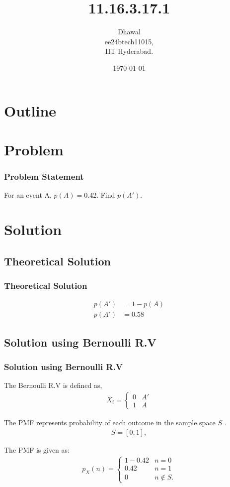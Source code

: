 \documentclass{beamer}
\title{11.16.3.17.1}
\author{Dhawal \\ ee24btech11015,\\IIT Hyderabad.}
\date{\today}
\providecommand{\sbrak}[1]{\ensuremath{{}\left[#1\right]}}
\providecommand{\brak}[1]{\ensuremath{\left(#1\right)}}
\theoremstyle{remark}
\numberwithin{equation}{section}
\begin{document}
\begin{frame}
\titlepage
\end{frame}

\section*{Outline}
\begin{frame}
\tableofcontents
\end{frame}
\section{Problem}
\begin{frame}
\frametitle{Problem Statement}
%
 For an event A, $p\brak{A}=0.42.$ Find $p\brak{A'}$.

\end{frame}

\section{Solution}
\subsection{Theoretical Solution}
\begin{frame}
\frametitle{Theoretical Solution}
\begin{align}
		p\brak{A'}&=1-p\brak{A}\\
        p\brak{A'}&=0.58
	\end{align}
	

\end{frame}

\subsection{Solution using Bernoulli R.V}
\begin{frame}
\frametitle{Solution using Bernoulli R.V}

The Bernoulli R.V is defined as,
\begin{align}
	X_i = \begin{cases}
		0 & A'\\	
		1 & A	
	\end{cases}
\end{align}

    The PMF represents probability of each outcome in the sample space $S$ . 
\begin{align*}
    S = \sbrak{0, 1},
\end{align*}

The PMF is given as:
\begin{align}
p_X\brak{n} = \begin{cases}
    1-0.42 & n = 0\\
    0.42 & n = 1 \\ 
    0 & n \notin S.
\end{cases}
\end{align}
	

\end{frame}
\end{document}
